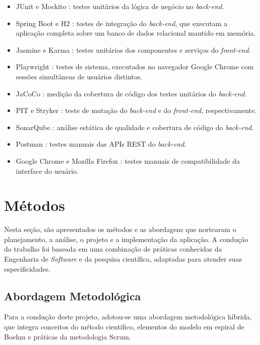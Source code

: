 \begin{itemize}
    \item JUnit \cite{JUnit2023} e Mockito \cite{Mockito2025}: testes unitários da lógica de negócio no \textit{back-end}.
    \item Spring Boot \cite{SpringBoot2024} e H2 \cite{H2Database2024}: testes de integração do \textit{back-end}, que executam a aplicação completa sobre um banco de dados relacional mantido em memória.
    \item Jasmine \cite{Jasmine2024} e Karma \cite{Karma2024}: testes unitários dos componentes e serviços do \textit{front-end}.
    \item Playwright \cite{Playwright2024}: testes de sistema, executados no navegador Google Chrome com sessões simultâneas de usuários distintos.
    \item JaCoCo \cite{JaCoCo2024}: medição da cobertura de código dos testes unitários do \textit{back-end}.
    \item PIT \cite{PIT2024} e Stryker \cite{Stryker2024}: teste de mutação do \textit{back-end} e do \textit{front-end}, respectivamente.
    \item SonarQube \cite{SonarQube2024}: análise estática de qualidade e cobertura de código do \textit{back-end}.
    \item Postman \cite{Postman2024}: testes manuais das APIs REST do \textit{back-end}.
    \item Google Chrome \cite{GoogleChrome2025} e Mozilla Firefox \cite{MozillaFirefox2026}: testes manuais de compatibilidade da interface do usuário.
\end{itemize}

\section[Métodos]{Métodos}
Nesta seção, são apresentados os métodos e as abordagens que nortearam o planejamento, a análise, o projeto e a implementação da aplicação. A condução do trabalho foi baseada em uma combinação de práticas conhecidas da Engenharia de \textit{Software} e da pesquisa científica, adaptadas para atender suas especificidades.

\subsection[Abordagem Metodológica]{Abordagem Metodológica}
Para a condução deste projeto, adotou-se uma abordagem metodológica híbrida, que integra conceitos do método científico, elementos do modelo em espiral de Boehm e práticas da metodologia Scrum.

